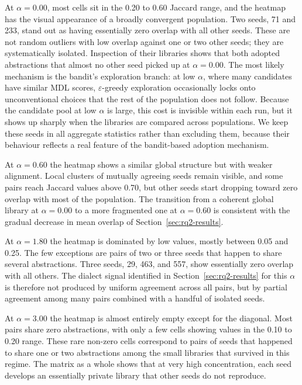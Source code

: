 At $\alpha = 0.00$, most cells sit in the 0.20 to 0.60 Jaccard range, and the heatmap has the visual appearance of a broadly convergent population. Two seeds, 71 and 233, stand out as having essentially zero overlap with all other seeds. These are not random outliers with low overlap against one or two other seeds; they are systematically isolated. Inspection of their libraries shows that both adopted abstractions that almost no other seed picked up at $\alpha = 0.00$. The most likely mechanism is the bandit's exploration branch: at low $\alpha$, where many candidates have similar MDL scores, $\varepsilon$-greedy exploration occasionally locks onto unconventional choices that the rest of the population does not follow. Because the candidate pool at low $\alpha$ is large, this cost is invisible within each run, but it shows up sharply when the libraries are compared across populations. We keep these seeds in all aggregate statistics rather than excluding them, because their behaviour reflects a real feature of the bandit-based adoption mechanism.

At $\alpha = 0.60$ the heatmap shows a similar global structure but with weaker alignment. Local clusters of mutually agreeing seeds remain visible, and some pairs reach Jaccard values above 0.70, but other seeds start dropping toward zero overlap with most of the population. The transition from a coherent global library at $\alpha = 0.00$ to a more fragmented one at $\alpha = 0.60$ is consistent with the gradual decrease in mean overlap of Section~\ref{sec:rq2-results}.

At $\alpha = 1.80$ the heatmap is dominated by low values, mostly between 0.05 and 0.25. The few exceptions are pairs of two or three seeds that happen to share several abstractions. Three seeds, 29, 463, and 557, show essentially zero overlap with all others. The dialect signal identified in Section~\ref{sec:rq2-results} for this $\alpha$ is therefore not produced by uniform agreement across all pairs, but by partial agreement among many pairs combined with a handful of isolated seeds.

At $\alpha = 3.00$ the heatmap is almost entirely empty except for the diagonal. Most pairs share zero abstractions, with only a few cells showing values in the 0.10 to 0.20 range. These rare non-zero cells correspond to pairs of seeds that happened to share one or two abstractions among the small libraries that survived in this regime. The matrix as a whole shows that at very high concentration, each seed develops an essentially private library that other seeds do not reproduce.

